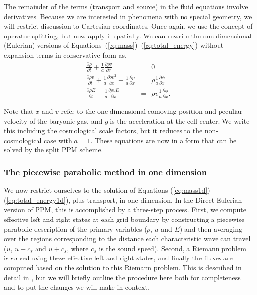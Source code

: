 The remainder of the terms (transport and source) in the fluid equations
involve derivatives.  
Because we are interested in phenomena with no special geometry, we will
restrict discussion to Cartesian coordinates.
Once again we use the concept of operator splitting,
but now apply it spatially.   We can rewrite the one-dimensional (Eulerian) 
versions of Equations~(\ref{eq:mass})--(\ref{eq:total_energy}) without expansion terms
in conservative form as,
\begin{eqnarray}
\frac{\partial \rho}{\partial t}  + \frac{1}{a} \frac{\partial \rho v }{\partial x}    & = &  
     0 \label{eq:mass1d} \\
\frac{\partial \rho v}{\partial t}  + \frac{1}{a} \frac{\partial \rho v^2}{\partial x}   + 
      \frac{1}{a} \frac{\partial p}{ \partial x} & = & 
      \rho \frac{1}{a} \frac{\partial \phi}{ \partial x}  \label{eq:momentum1d}  \\
\frac{\partial \rho E}{\partial t}  + \frac{1}{a} \frac{\partial \rho v E}{\partial x}  & =  &
      \rho v \frac{1}{a} \frac{\partial \phi}{\partial x}. \label{eq:total_energy1d}
\end{eqnarray}

%
Note that $x$ and $v$ refer to the one dimensional comoving position and 
peculiar velocity of the baryonic gas, and $g$ is the acceleration at the cell center.
We write this including the cosmological scale factors, but it reduces to the non-cosmological case with $a = 1$.
These equations are now in a form that can be solved by the split PPM scheme.


\subsubsection{The piecewise parabolic method in one dimension} %

We now restrict ourselves to the solution of Equations
(\ref{eq:mass1d})--(\ref{eq:total_energy1d}), plus transport, in one
dimension.  In the Direct Eulerian version of PPM, this is
accomplished by a three-step process.  First, we compute effective
left and right states at each grid boundary by constructing a
piecewise parabolic description of the primary variables ($\rho$, $u$
and $E$) and then averaging over the regions corresponding to the
distance each characteristic wave can travel ($u$, $u-c_s$ and
$u+c_s$, where $c_s$ is the sound speed).
Second, a Riemann problem is solved using these effective left and
right states, and finally the fluxes are computed based on the
solution to this Riemann problem.  This is described in detail in
\citet{1984JCoPh..54..174C}, but we will briefly outline the procedure
here both for completeness and to put the changes we will make in
context.


